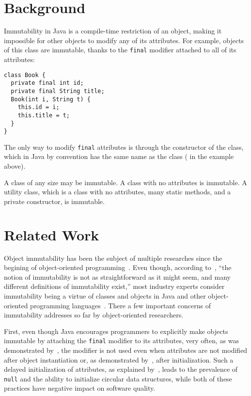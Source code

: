 \documentclass[sigconf]{acmart}
\begin{document}
\section{Background}
\label{sec:background}

Immutability in Java is a compile-time restriction of an object, making it
impossible for other objects to modify any of its attributes. For example,
objects of this class are immutable, thanks to the \texttt{final} modifier
attached to all of its attributes:

\begin{verbatim}
class Book {
  private final int id;
  private final String title;
  Book(int i, String t) {
    this.id = i;
    this.title = t;
  }
}
\end{verbatim}

The only way to modify \texttt{final} attributes is through the constructor
of the class, which in Java by convention has the same name as the class (
in the example above).

A class of any size may be immutable. A class with no attributes is immutable.
A utility class, which is a class with no attributes, many static methods,
and a private constructor, is immutable.

\section{Related Work}
\label{sec:related}

Object immutability has been the subject of multiple researches since
the begining of object-oriented programming~\citep{hakonen1999,porat2000,lea2000,taivalsaari1993}.
Even though, according to~\citet{potanin2013},
``the notion of immutability is not as straightforward as it might seem, and many
different definitions of immutability exist,'' most industry experts consider
immutability being a virtue of classes and objects in Java and other
object-oriented programming languages~\citep{bloch2016}. There a few important
concerns of immutability addresses so far by object-oriented researchers.

First, even though Java encourages programmers to explicitly make objects immutable
by attaching the \texttt{final} modifier to its attributes, very often, as was
demonstrated by~\citet{unkel2008}, the modifier is not used even when
attributes are not modified after object instantiation or, as demonstrated
by~\citet{nelson2012}, after initialization. Such a delayed initialization of attributes, as
explained by~\citet{fahndrich2007}, leads to the prevalence of \texttt{null}
and the ability to initialize circular data structures, while both of these
practices have negative impact on software quality.
\end{document}
